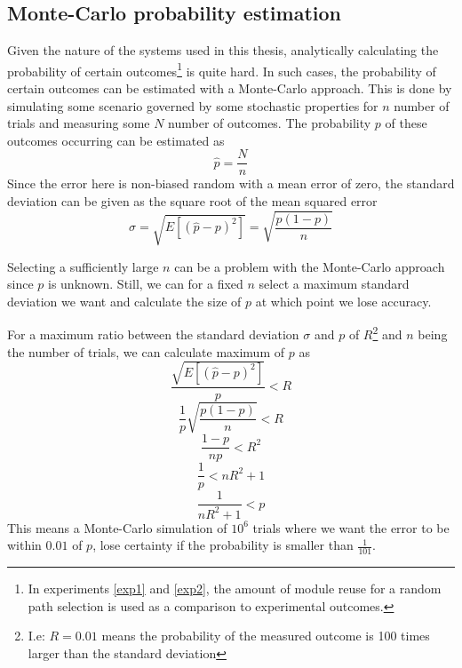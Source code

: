 \subsection{Monte-Carlo probability estimation}
\label{mc-estimate}
Given the nature of the systems used in this thesis, analytically calculating the probability of certain outcomes\footnote{In experiments \ref{exp1} and \ref{exp2}, the amount of module reuse for a random path selection is used as a comparison to experimental outcomes.} is quite hard. In such cases, the probability of certain outcomes can be estimated with a Monte-Carlo approach. This is done by simulating some scenario governed by some stochastic properties for \(n\) number of trials and measuring some \(N\) number of outcomes. The probability \(p\) of these outcomes occurring can be estimated as 
\begin{equation*}
    \hat{p}=\frac{N}{n}
\end{equation*}
Since the error here is non-biased random with a mean error of zero, the standard deviation can be given as the square root of the mean squared error 
\begin{equation*}
    \sigma=\sqrt{E[(\hat{p}-p)^{2}]} =\sqrt{\frac{p(1-p)}{n}}
\end{equation*}


Selecting a sufficiently large \(n\) can be a problem with the Monte-Carlo approach since \(p\) is unknown. Still, we can for a fixed \(n\) select a maximum standard deviation we want and calculate the size of \(p\) at which point we lose accuracy. 

For a maximum ratio between the standard deviation \(\sigma\) and \(p\) of \(R\)\footnote{I.e: \(R=0.01\) means the probability of the measured outcome is 100 times larger than the standard deviation} and \(n\) being the number of trials, we can calculate maximum of \(p\) as
\begin{equation*}
    \frac{\sqrt{E[(\hat{p}-p)^{2}]}}{p} < R
\end{equation*}
\begin{equation*}
    \frac{1}{p}\sqrt{\frac{p(1-p)}{n}} < R
\end{equation*}
\begin{equation*}
    \frac{1-p}{np} < R^{2}
\end{equation*}
\begin{equation*}
    \frac{1}{p}< nR^{2}+1
\end{equation*}
\begin{equation}
    \frac{1}{nR^{2}+1}<p
    \label{eq:montecarloP}
\end{equation}
This means a Monte-Carlo simulation of \(10^{6}\) trials where we want the error to be within  \(0.01\) of \(p\), lose certainty if the probability is smaller than \(\frac{1}{101}\).

